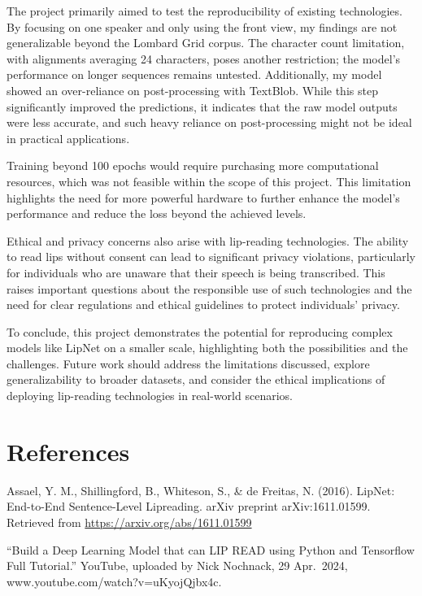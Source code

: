 \documentclass[
]{article}
\begin{document}
The project primarily aimed to test the reproducibility of existing
technologies. By focusing on one speaker and only using the front view,
my findings are not generalizable beyond the Lombard Grid corpus. The
character count limitation, with alignments averaging 24 characters,
poses another restriction; the model's performance on longer sequences
remains untested. Additionally, my model showed an over-reliance on
post-processing with TextBlob. While this step significantly improved
the predictions, it indicates that the raw model outputs were less
accurate, and such heavy reliance on post-processing might not be ideal
in practical applications.

Training beyond 100 epochs would require purchasing more computational
resources, which was not feasible within the scope of this project. This
limitation highlights the need for more powerful hardware to further
enhance the model's performance and reduce the loss beyond the achieved
levels.

Ethical and privacy concerns also arise with lip-reading technologies.
The ability to read lips without consent can lead to significant privacy
violations, particularly for individuals who are unaware that their
speech is being transcribed. This raises important questions about the
responsible use of such technologies and the need for clear regulations
and ethical guidelines to protect individuals' privacy.

To conclude, this project demonstrates the potential for reproducing
complex models like LipNet on a smaller scale, highlighting both the
possibilities and the challenges. Future work should address the
limitations discussed, explore generalizability to broader datasets, and
consider the ethical implications of deploying lip-reading technologies
in real-world scenarios.

\newpage

\section{References}\label{references}

Assael, Y. M., Shillingford, B., Whiteson, S., \& de Freitas, N. (2016).
LipNet: End-to-End Sentence-Level Lipreading. arXiv preprint
arXiv:1611.01599. Retrieved from \url{https://arxiv.org/abs/1611.01599}

``Build a Deep Learning Model that can LIP READ using Python and
Tensorflow Full Tutorial.'' YouTube, uploaded by Nick Nochnack, 29
Apr.~2024, www.youtube.com/watch?v=uKyojQjbx4c.
\end{document}
